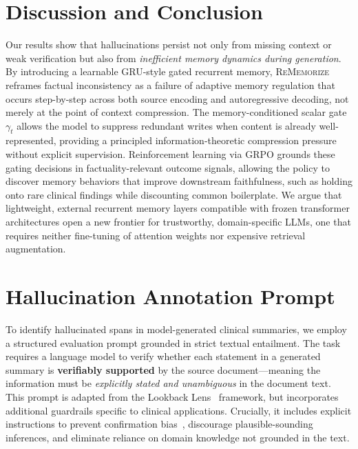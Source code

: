 \documentclass{article}
\begin{document}
\section{Discussion and Conclusion}
Our results show that hallucinations persist not only from missing context or weak verification but also from \emph{inefficient memory dynamics during generation}.
By introducing a learnable GRU-style gated recurrent memory, \textsc{ReMemorize} reframes factual inconsistency as a failure of adaptive memory regulation that occurs step-by-step across both source encoding and autoregressive decoding, not merely at the point of context compression.
The memory-conditioned scalar gate $\gamma_t$ allows the model to suppress redundant writes when content is already well-represented, providing a principled information-theoretic compression pressure without explicit supervision.
Reinforcement learning via GRPO grounds these gating decisions in factuality-relevant outcome signals, allowing the policy to discover memory behaviors that improve downstream faithfulness, such as holding onto rare clinical findings while discounting common boilerplate.
We argue that lightweight, external recurrent memory layers compatible with frozen transformer architectures open a new frontier for trustworthy, domain-specific LLMs, one that requires neither fine-tuning of attention weights nor expensive retrieval augmentation.

\appendix

\section{Hallucination Annotation Prompt}
\label{appendix:annotation_prompt}

To identify hallucinated spans in model-generated clinical summaries, we employ a structured evaluation prompt grounded in strict textual entailment. The task requires a language model to verify whether each statement in a generated summary is \textbf{verifiably supported} by the source document---meaning the information must be \textit{explicitly stated and unambiguous} in the document text.
This prompt is adapted from the Lookback Lens~\citep{chuang2024lookback} framework, but incorporates additional guardrails specific to clinical applications. Crucially, it includes explicit instructions to prevent confirmation bias~\citep{adiba_bias_2025}, discourage plausible-sounding inferences, and eliminate reliance on domain knowledge not grounded in the text.
\end{document}
